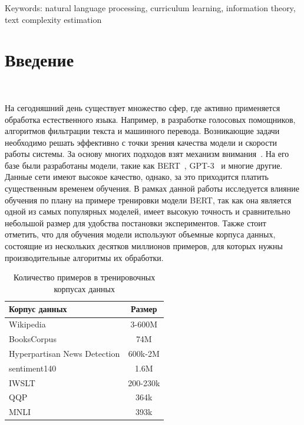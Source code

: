 \documentclass{spbau-diploma}
\begin{document}
Keywords: natural language processing, curriculum learning, information theory, text complexity estimation
\section*{Введение}
\ 

На сегодняшний день существует множество сфер, где активно применяется обработка естественного языка. Например, в разработке голосовых помощников, алгоритмов фильтрации текста и машинного перевода. Возникающие задачи необходимо решать эффективно с точки зрения качества модели и скорости работы системы. За основу многих подходов взят механизм внимания~\cite{vaswani2017attention}. На его базе были разработаны модели, такие как BERT~\cite{devlin2018bert}, GPT-3~\cite{brown2020language} и многие другие. Данные сети имеют высокое качество, однако, за это приходится платить существенным временем обучения. В рамках данной работы исследуется влияние обучения по плану на примере тренировки модели BERT, так как она является одной из самых популярных моделей, имеет высокую точность и сравнительно небольшой размер для удобства постановки экспериментов. Также стоит отметить, что для обучения модели используют объемные корпуса данных, состоящие из нескольких десятков миллионов примеров, для которых нужны производительные алгоритмы их обработки. 

\begin{table}[h]
	\caption{Количество примеров в тренировочных корпусах данных}
	\label{table:dataset_sizes}
	\centering
	\begin{tabular}{|l|c|}
		\hline
		Корпус данных & Размер \\
		\hline\hline
		Wikipedia & 3-600M \\
		BooksCorpus & 74M\\
		\hline\hline
		Hyperpartisan News Detection & 600k-2M \\
		sentiment140 & 1.6M \\
		IWSLT & 200-230k \\
		QQP & 364k \\
		MNLI & 393k \\
		\hline
	\end{tabular}
\end{table}
\end{document}
